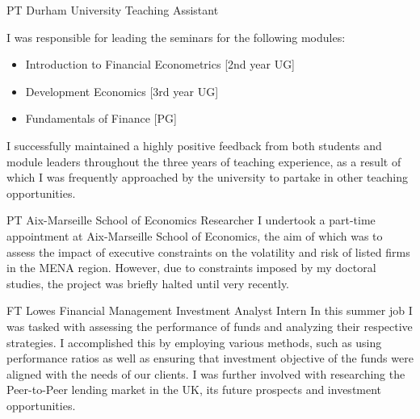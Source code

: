 \documentclass[10pt]{article} %
\begin{document}
\begin{paracol}{2}






{PT} %
{Durham University} %
{Teaching Assistant } %
{I was responsible for leading the seminars for the following modules:
\begin{itemize}
\item Introduction to Financial Econometrics [2nd year UG]
\item Development Economics [3rd year UG]
\item Fundamentals of Finance [PG]
\end{itemize}
 I success\-fully main\-tained a highly
 positive feedback from both students and mo\-dule leaders throughout the three years of teaching experience, as a result of which I
 was frequently approached by the university to partake in other teaching opportunities.}  %


{PT} %
{Aix-Marseille School of Economics} %
{Researcher} %
{I undertook a part-time appointment at Aix-Marseille School of Eco\-nomics, the aim of which was to assess the impact of executive cons\-traints on the vola\-tility and risk of listed firms in the MENA region. However, due to constraints imposed by my doctoral studies, the project was briefly halted until very recently. }  %


{FT} %
{Lowes Financial Management} %
{Investment Analyst Intern} %
{In this summer job I was tasked with assessing the performance of funds and analyzing their respective strategies. I accomplished this by emplo\-ying various methods, such as using performance ratios as well as ensu\-ring that investment objective of the funds were aligned with the needs of our clients. I was further involved with resear\-ching the Peer-to-Peer lending market in the UK, its future prospects and investment oppor\-tunities.} %


\end{paracol}
\end{document}
